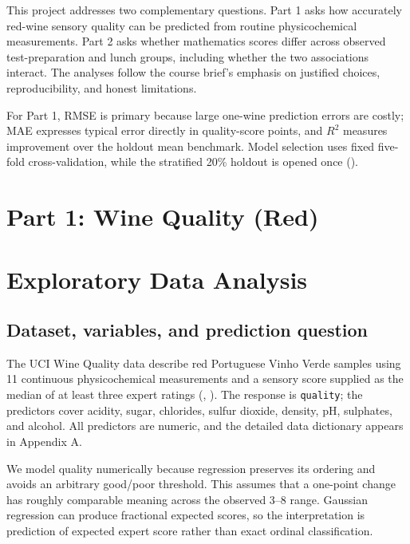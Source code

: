 \documentclass[
  10pt,
]{article}
\begin{document}
This project addresses two complementary questions. Part 1 asks how
accurately red-wine sensory quality can be predicted from routine
physicochemical measurements. Part 2 asks whether mathematics scores
differ across observed test-preparation and lunch groups, including
whether the two associations interact. The analyses follow the course
brief's emphasis on justified choices, reproducibility, and honest
limitations.

For Part 1, RMSE is primary because large one-wine prediction errors are
costly; MAE expresses typical error directly in quality-score points,
and \(R^2\) measures improvement over the holdout mean benchmark. Model
selection uses fixed five-fold cross-validation, while the stratified
20\% holdout is opened once ().

\section{Part 1: Wine Quality (Red)}\label{part-1-wine-quality-red}

\section{Exploratory Data Analysis}\label{exploratory-data-analysis}

\subsection{Dataset, variables, and prediction
question}\label{dataset-variables-and-prediction-question}

The UCI Wine Quality data describe red Portuguese Vinho Verde samples
using 11 continuous physicochemical measurements and a sensory score
supplied as the median of at least three expert ratings
(,
). The response is \texttt{quality}; the
predictors cover acidity, sugar, chlorides, sulfur dioxide, density, pH,
sulphates, and alcohol. All predictors are numeric, and the detailed
data dictionary appears in Appendix A.

We model quality numerically because regression preserves its ordering
and avoids an arbitrary good/poor threshold. This assumes that a
one-point change has roughly comparable meaning across the observed 3--8
range. Gaussian regression can produce fractional expected scores, so
the interpretation is prediction of expected expert score rather than
exact ordinal classification.
\end{document}
